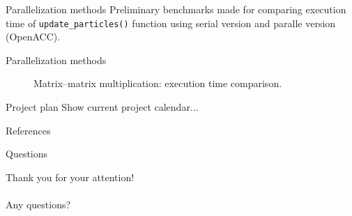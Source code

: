 \documentclass[aspectratio=169]{beamer}
\begin{document}
\begin{frame}[fragile]{Parallelization methods}
	Preliminary benchmarks made for comparing execution time of \texttt{update_particles()} function using serial version and paralle version (OpenACC).
\end{frame}

\begin{frame}[fragile]{Parallelization methods}
	\begin{figure}[H]
		\centering
		
		\caption{Matrix--matrix multiplication: execution time comparison.}
	\end{figure}
\end{frame}

\begin{frame}[fragile]{Project plan}
	Show current project calendar...
\end{frame}

\begin{frame}[fragile]{References}
	\printbibliography
\end{frame}

\begin{frame}[fragile]{Questions}
	\begin{center}
		Thank you for your attention!\\
		\\
		Any questions?
	\end{center}
\end{frame}
\end{document}
